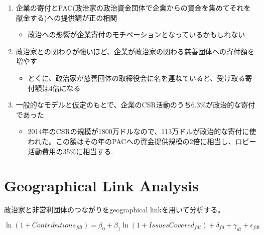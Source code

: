 \documentclass[../root]{subfiles}
\begin{document}
    \begin{enumerate}
    \def\labelenumi{\arabic{enumi}.}
    
    \item
      企業の寄付とPAC(政治家の政治資金団体で企業からの資金を集めてそれを献金する)への提供額が正の相関

      \begin{itemize}
      
      \item
        政治への影響が企業寄付のモチベーションとなっているかもしれない
      \end{itemize}
    \item
      政治家との関わりが強いほど、企業が政治家の関わる慈善団体への寄付額を増やす

      \begin{itemize}
      
      \item
        とくに、政治家が慈善団体の取締役会に名を連ねていると、受け取る寄付額は4倍になる
      \end{itemize}
    \item
      一般的なモデルと仮定のもとで、企業のCSR活動のうち6.3\%が政治的な寄付であった

      \begin{itemize}
      
      \item
        2014年のCSRの規模が1800万ドルなので、113万ドルが政治的な寄付に使われた。この額はその年のPACへの資金提供規模の2倍に相当し、ロビー活動費用の35\%に相当する.
      \end{itemize}
    \end{enumerate}

    \section{Geographical Link Analysis}\label{geographical-link-analysis}

    政治家と非営利団体のつながりをgeographical linkを用いて分析する。

    \begin{equation}
    \ln(1 + Contributions_{fdt}) = \beta_0 + \beta_1 \ln(1 + IssuesCovered_{fdt}) + \delta_{fd} + \gamma_{dt} + \epsilon_{fdt}
    \end{equation}
\end{document}
